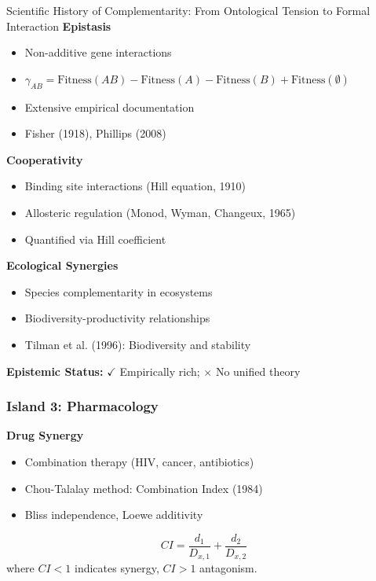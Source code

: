 \begin{chapter}{Scientific History of Complementarity: From Ontological Tension to Formal Interaction}
\textbf{Epistasis}
\begin{itemize}[noitemsep]
    \item Non-additive gene interactions
    \item $\gamma_{AB} = \text{Fitness}(AB) - \text{Fitness}(A) - \text{Fitness}(B) + \text{Fitness}(\emptyset)$
    \item Extensive empirical documentation
    \item Fisher (1918), Phillips (2008)
\end{itemize}

\textbf{Cooperativity}
\begin{itemize}[noitemsep]
    \item Binding site interactions (Hill equation, 1910)
    \item Allosteric regulation (Monod, Wyman, Changeux, 1965)
    \item Quantified via Hill coefficient
\end{itemize}

\textbf{Ecological Synergies}
\begin{itemize}[noitemsep]
    \item Species complementarity in ecosystems
    \item Biodiversity-productivity relationships
    \item Tilman et al. (1996): Biodiversity and stability
\end{itemize}

\textbf{Epistemic Status:} $\checkmark$ Empirically rich; $\times$ No unified theory

\subsubsection{Island 3: Pharmacology}

\textbf{Drug Synergy}
\begin{itemize}[noitemsep]
    \item Combination therapy (HIV, cancer, antibiotics)
    \item Chou-Talalay method: Combination Index (1984)
    \item Bliss independence, Loewe additivity
\end{itemize}

\begin{definition}
\[
CI = \frac{d_1}{D_{x,1}} + \frac{d_2}{D_{x,2}}
\]
where $CI < 1$ indicates synergy, $CI > 1$ antagonism.
\end{definition}


\end{chapter}
